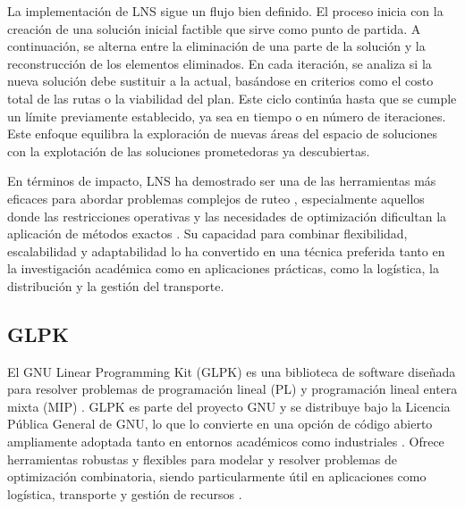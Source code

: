 \documentclass[12pt]{article}
\begin{document}
La implementación de LNS sigue un flujo bien definido. El proceso inicia con la creación de una solución inicial factible que sirve como punto de partida. A continuación, se alterna entre la eliminación de una parte de la solución y la reconstrucción de los elementos eliminados. En cada iteración, se analiza si la nueva solución debe sustituir a la actual, basándose en criterios como el costo total de las rutas o la viabilidad del plan. Este ciclo continúa hasta que se cumple un límite previamente establecido, ya sea en tiempo o en número de iteraciones. Este enfoque equilibra la exploración de nuevas áreas del espacio de soluciones con la explotación de las soluciones prometedoras ya descubiertas.

En términos de impacto, LNS ha demostrado ser una de las herramientas más eficaces para abordar problemas complejos de ruteo \agregaesto{[REF]}, especialmente aquellos donde las restricciones operativas y las necesidades de optimización dificultan la aplicación de métodos exactos \agregaesto{[REF]}. Su capacidad para combinar flexibilidad, escalabilidad y adaptabilidad lo ha convertido en una técnica preferida tanto en la investigación académica como en aplicaciones prácticas, como la logística, la distribución y la gestión del transporte.



\subsection{GLPK}
El GNU Linear Programming Kit (GLPK) es una biblioteca de software diseñada para resolver problemas de programación lineal (PL) y programación lineal entera mixta (MIP) \agregaesto{[REF]}. GLPK es parte del proyecto GNU \agregaesto{[REF]} y se distribuye bajo la Licencia Pública General de GNU, lo que lo convierte en una opción de código abierto ampliamente adoptada tanto en entornos académicos como industriales \agregaesto{[REF]}. Ofrece herramientas robustas y flexibles para modelar y resolver problemas de optimización combinatoria, siendo particularmente útil en aplicaciones como logística, transporte y gestión de recursos \agregaesto{[REF]}.
\end{document}
